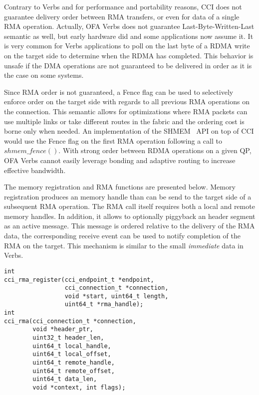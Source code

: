 Contrary to Verbs  and for performance and portability reasons, CCI does not guarantee delivery order between RMA transfers, or even for data of a single RMA operation. Actually, OFA Verbs does not guarantee Last-Byte-Written-Last semantic as well, but early hardware did and some applications now assume it. It is very common for Verbs applications to poll on the last byte of a RDMA write on the target side to determine when the RDMA has completed. This behavior is unsafe if the DMA operations are not guaranteed to be delivered in order as it is the case on some systems.

Since RMA order is not guaranteed, a Fence flag can be used to selectively 
enforce order on the target side with regards to all previous RMA operations 
on the connection. This semantic allows for optimizations where RMA packets 
can use multiple links or take different routes in the fabric and the ordering 
cost is borne only when needed. An implementation of the SHMEM~\cite{openshmem} API on top of CCI would use the Fence flag on the first RMA operation following a call to $shmem\_fence()$. With strong order between RDMA operations on a given QP, OFA Verbs cannot easily leverage bonding and adaptive routing to increase effective bandwidth.

The memory registration and RMA functions are presented below. Memory registration produces an memory handle than can be send to the target side of a subsequent RMA operation. The RMA call itself requires both a local and remote memory handles. In addition, it allows to optionally piggyback an header segment as an active message. This message is ordered relative to the delivery of the RMA data, the corresponding receive event can be used to notify completion of the RMA on the target. This mechanism is similar to the small \emph{immediate} data in Verbs.

\lstset{language=C, frame=single, basicstyle=\ttfamily\small}
\begin{lstlisting}
int 
cci_rma_register(cci_endpoint_t *endpoint,
                 cci_connection_t *connection,
                 void *start, uint64_t length,
                 uint64_t *rma_handle);
int 
cci_rma(cci_connection_t *connection, 
        void *header_ptr, 
        uint32_t header_len, 
        uint64_t local_handle, 
        uint64_t local_offset, 
        uint64_t remote_handle, 
        uint64_t remote_offset,
        uint64_t data_len, 
        void *context, int flags);
\end{lstlisting}

